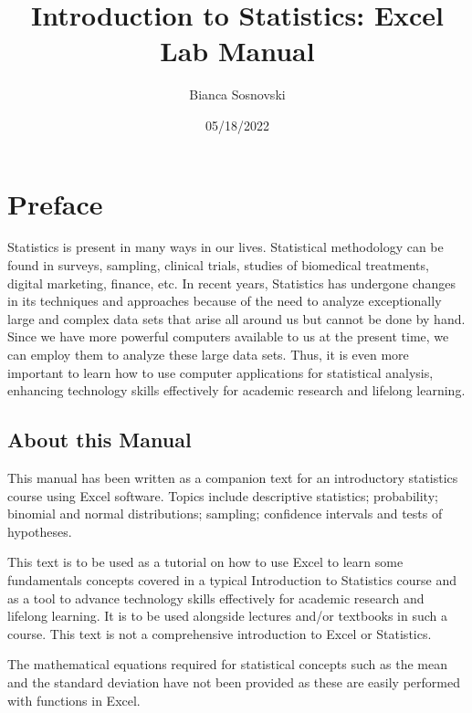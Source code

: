 \documentclass[
  12pt,
  letterpaper,
]{book}
\title{Introduction to Statistics: Excel Lab Manual}
\author{Bianca Sosnovski}
\date{05/18/2022}
\begin{document}
\maketitle

{
\setcounter{tocdepth}{1}
\tableofcontents
}
\listoftables
{}
\hypertarget{preface}{%
\chapter*{Preface}\label{preface}}

Statistics is present in many ways in our lives. Statistical methodology can be found in surveys, sampling, clinical trials, studies of biomedical treatments, digital marketing, finance, etc. In recent years, Statistics has undergone changes in its techniques and approaches because of the need to analyze exceptionally large and complex data sets that arise all around us but cannot be done by hand. Since we have more powerful computers available to us at the present time, we can employ them to analyze these large data sets. Thus, it is even more important to learn how to use computer applications for statistical analysis, enhancing technology skills effectively for academic research and lifelong learning.

\hypertarget{about-this-manual}{%
\section*{About this Manual}\label{about-this-manual}}

This manual has been written as a companion text for an introductory statistics course using Excel software. Topics include descriptive statistics; probability; binomial and normal distributions; sampling; confidence intervals and tests of hypotheses.

This text is to be used as a tutorial on how to use Excel to learn some fundamentals concepts covered in a typical Introduction to Statistics course and as a tool to advance technology skills effectively for academic research and lifelong learning. It is to be used alongside lectures and/or textbooks in such a course. This text is not a comprehensive introduction to Excel or Statistics.

The mathematical equations required for statistical concepts such as the mean and the standard deviation have not been provided as these are easily performed with functions in Excel.
\end{document}

